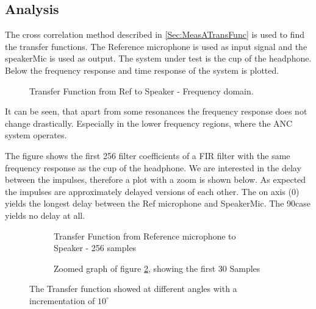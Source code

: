 \subsection{Analysis}
The cross correlation method described in \autoref{Sec:MeasATransFunc} is used to find the transfer functions. The Reference microphone is used as input signal and the speakerMic is used as output. The system under test is the cup of the headphone. 
Below the frequency response and time response of the system is plotted. 
\begin{figure}[H]
	
	\label{Fig:AngOfIncFreq}
	\caption{Transfer Function from Ref to Speaker - Frequency domain.}
\end{figure}
It can be seen, that apart from some resonances the frequency response does not change drastically. Especially in the lower frequency regions, where the ANC system operates. 

%	
The figure shows the first 256 filter coefficients of a FIR filter with the same frequency response as the cup of the headphone. We are interested in the delay between the impulses, therefore a plot with a zoom is shown below.
As expected the impulses are approximately delayed versions of each other. The on axis (0\degrees) yields the longest delay between the Ref microphone and SpeakerMic. The 90\degrees  case yields no delay at all. 


\begin{figure}[H]
	\centering
	\begin{subfigure}[b]{\textwidth}
	
	\label{Fig:AngOfIncTime}
	\caption{Transfer Function from Reference microphone to Speaker - 256 samples}
	\end{subfigure} 
	\begin{subfigure}[b]{\textwidth}
	
	\label{Fig:AngOfIncTimezoom}
	\caption{Zoomed graph of figure \ref{Fig:AngOfIncTime}, showing the first 30 Samples}
	\end{subfigure}
	\caption{The Transfer function showed at different angles with a incrementation of $10^{\circ}$}
	\label{fig:AngOfIncResult}
\end{figure}

